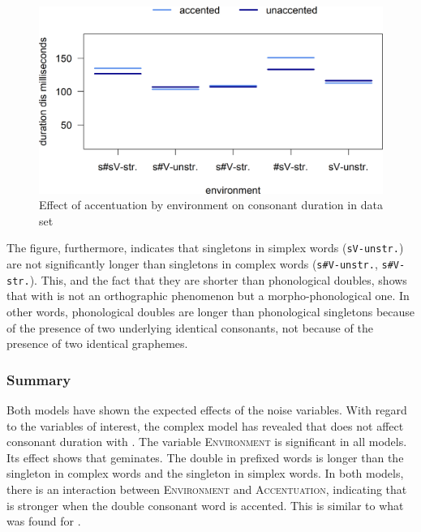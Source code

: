 \begin{figure}
	
	\includegraphics [scale=0.5] {images/Experiment/disModelCompleteinterEnvAcc}
	\caption{Effect of accentuation by environment on consonant duration in data set}
	\label{fig:  dis experiment Env and accent}
\end{figure}


The figure, furthermore, indicates that singletons in simplex words (\texttt{sV-unstr.}) are not significantly longer than singletons in complex words (\texttt{s\#V-unstr.}, \texttt{s\#V- str.}). This, and the fact that they are shorter than phonological doubles, shows that  with  is not an orthographic phenomenon but a morpho-phonological one. In other words, phonological doubles are longer than phonological singletons because of the presence of two underlying identical consonants, not because of the presence of two identical graphemes.



\subsubsection{Summary}

Both models have shown the expected effects of the noise variables. With regard to the variables of interest, the complex model has revealed that  does not affect consonant duration with . The variable \textsc{Environment} is significant in all models. Its effect shows that  geminates. The double in prefixed words is longer than the singleton in complex words and the singleton in simplex words. 
In both models, there is an interaction between \textsc{Environment} and \textsc{Accentuation}, indicating that  is stronger when the double consonant word is accented. This is similar to what was found for .

